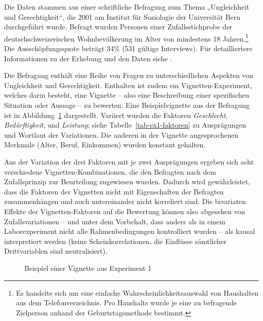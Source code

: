 \documentclass[a4paper,12pt]{article}
\begin{document}
Die Daten stammen aus einer schriftliche Befragung zum Thema „Ungleichheit und
Gerechtigkeit“, die 2001 am Institut für Soziologie der Universität Bern
durchgeführt wurde. Befragt wurden Personen einer Zufallsstichprobe der
deutschschweizerischen Wohnbevölkerung im Alter von mindestens 18
Jahren.\footnote{Es handelte sich um eine einfache Wahrscheinlichkeitsauswahl
von Haushalten aus dem Telefonverzeichnis. Pro Haushalts wurde je eine zu
befragende Zielperson anhand der Geburtstagsmethode bestimmt.} Die
Ausschöpfungsquote beträgt 34\% (531 gültige Interviews). Für detailliertere
Informationen zu der Erhebung und den Daten siehe \citet{Jann-2001}.

Die Befragung enthält eine Reihe von Fragen zu unterschiedlichen Aspekten von
Ungleichheit und Gerechtigkeit. Enthalten ist zudem ein Vignetten-Experiment,
welches darin besteht, eine Vignette -- also eine Beschreibung einer
spezifischen Situation oder Aussage -- zu bewerten. Eine Beispielvignette aus
der Befragung ist in Abbildung~\ref{fig-1} dargestellt. Variiert wurden die
Faktoren \emph{Geschlecht}, \emph{Bedürftigkeit}, und \emph{Leistung}; siehe 
Tabelle~\ref{tab-ex1-faktoren} zu Ausprägungen und Wortlaut der Variationen.
Die anderen in der Vignette angesprochenen Merkmale (Alter, Beruf, Einkommen)
wurden konstant gehalten.

Aus der Variation der drei Faktoren mit je zwei Ausprägungen ergeben sich acht
verschiedene Vignetten-Kombinationen, die den Befragten nach dem Zufallsprinzip
zur Beurteilung zugewiesen wurden. Dadurch wird gewährleistet, dass die
Faktoren der Vignetten nicht mit Eigenschaften der Befragten zusammenhängen und
auch untereinander nicht korreliert sind. Die bivariaten Effekte der
Vignetten-Faktoren auf die Bewertung können also abgesehen von
Zufallsvariationen – und unter dem Vorbehalt, dass anders als in einem
Laborexperiment nicht alle Rahmenbedingungen kontrolliert wurden – als
kausal interpretiert werden (keine Scheinkorrelationen, die Einflüsse
sämtlicher Drittvariablen sind neutralisiert).


\begin{figure}\centering
    \caption{Beispiel einer Vignette aus Experiment 1}\label{fig-1}
\end{figure}
\end{document}
